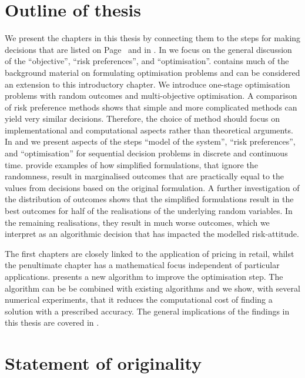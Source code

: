 \documentclass[main.tex]{subfiles}
\begin{document}
\section{Outline of thesis}
We present the chapters in this thesis by connecting them to the
steps for making decisions that are listed
on Page~\pageref{enum:making_decisions} and in .
In  we focus on the general discussion of the
``objective'', ``risk preferences'', and ``optimisation''.
 contains much of the background material on formulating
optimisation problems and can be considered an extension to this
introductory chapter. We introduce one-stage optimisation problems with
random outcomes and multi-objective optimisation.
A comparison of risk preference methods shows that simple and more complicated
methods can yield very similar decisions. Therefore, the choice of
method should focus on implementational and computational aspects
rather than theoretical arguments.
In  and
 we present  aspects of the steps ``model of the system'', ``risk
preferences'', and ``optimisation'' for sequential decision problems
in discrete and continuous time.
 provide examples of
how simplified formulations, that ignore the randomness, result in
marginalised outcomes that are practically equal to the values from
decisions based on the original formulation. A further investigation
of the distribution of outcomes shows that the simplified formulations
result in the best outcomes for half of the realisations of the
underlying random variables. In the remaining realisations, they
result in much worse outcomes, which we interpret as an algorithmic
decision that has impacted the modelled risk-attitude.

The first chapters are closely linked to the application of pricing
in retail, whilst the penultimate chapter has a mathematical focus
independent of particular applications.
 presents a new
algorithm to improve the optimisation step. The algorithm can be
be combined with existing algorithms and we show, with several
numerical experiments, that it reduces the computational cost of
finding a solution with a prescribed accuracy.
The general implications of the findings in this thesis are covered in
.

\section{Statement of originality}


\biblio{} %
\end{document}
